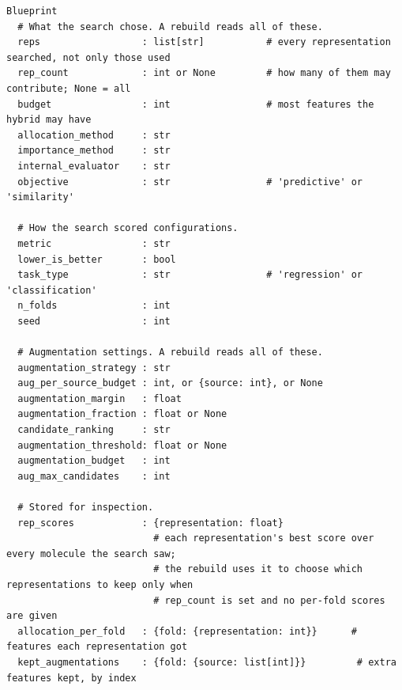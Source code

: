 
\label{app:add:blueprint_listing}
\begin{lstlisting}[float=htbp, breaklines=true, basicstyle=\scriptsize\ttfamily, columns=fullflexible, keepspaces=true, frame=single, caption={Fields of a blueprint and their types. Comment lines group the fields, and each field is given with its type and, where needed, a comment on its meaning.}, label=lst:blueprint, captionpos=b]
Blueprint
  # What the search chose. A rebuild reads all of these.
  reps                  : list[str]           # every representation searched, not only those used
  rep_count             : int or None         # how many of them may contribute; None = all
  budget                : int                 # most features the hybrid may have
  allocation_method     : str
  importance_method     : str
  internal_evaluator    : str
  objective             : str                 # 'predictive' or 'similarity'

  # How the search scored configurations.
  metric                : str
  lower_is_better       : bool
  task_type             : str                 # 'regression' or 'classification'
  n_folds               : int
  seed                  : int

  # Augmentation settings. A rebuild reads all of these.
  augmentation_strategy : str
  aug_per_source_budget : int, or {source: int}, or None
  augmentation_margin   : float
  augmentation_fraction : float or None
  candidate_ranking     : str
  augmentation_threshold: float or None
  augmentation_budget   : int
  aug_max_candidates    : int

  # Stored for inspection.
  rep_scores            : {representation: float}
                          # each representation's best score over every molecule the search saw;
                          # the rebuild uses it to choose which representations to keep only when
                          # rep_count is set and no per-fold scores are given
  allocation_per_fold   : {fold: {representation: int}}      # features each representation got
  kept_augmentations    : {fold: {source: list[int]}}         # extra features kept, by index
\end{lstlisting}

